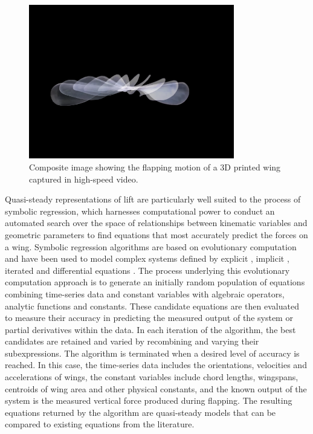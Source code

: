 \documentclass{article}
\begin{document}
\begin{figure}
\centering
\includegraphics[trim=0 120 70 170, clip, width=0.8\textwidth]{figures/wing_frames}
\caption{Composite image showing the flapping motion of a 3D printed
  wing captured in high-speed video.\label{fig:wing_frames}}
\end{figure}

Quasi-steady representations of lift are particularly well suited to the process
of symbolic regression, which harnesses computational power to conduct an
automated search over the space of relationships between kinematic variables and
geometric parameters to find equations that most accurately predict the forces
on a wing.  Symbolic regression algorithms are based on evolutionary computation
\cite{koza1992genetic,forrest1993genetic} and have been used to model complex
systems defined by explicit
\cite{duffy2002using,fillon2007symbolic,bautu2005symbolic}, implicit
\cite{schmidt2010symbolic}, iterated \cite{schmidt2009solving} and differential
equations \cite{bongard2007automated}.  The process underlying this evolutionary
computation approach is to generate an initially random population of equations
combining time-series data and constant variables with algebraic operators,
analytic functions and constants.  These candidate equations are then evaluated
to measure their accuracy in predicting the measured output of the system or
partial derivatives within the data.  In each iteration of the algorithm, the
best candidates are retained and varied by recombining and varying their
subexpressions. The algorithm is terminated when a desired level of accuracy is
reached.  In this case, the time-series data includes the orientations,
velocities and accelerations of wings, the constant variables include chord
lengths, wingspans, centroids of wing area and other physical constants, and the
known output of the system is the measured vertical force produced during
flapping.  The resulting equations returned by the algorithm are quasi-steady
models that can be compared to existing equations from the literature.
\end{document}
